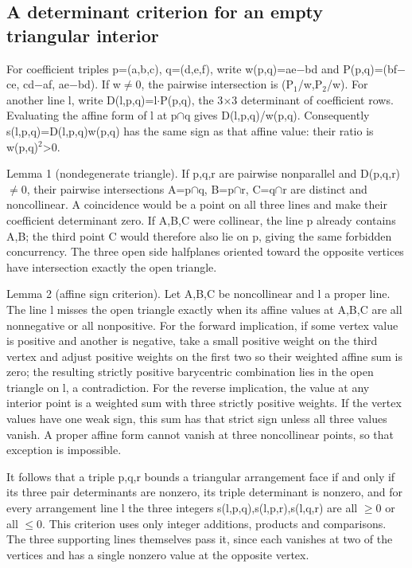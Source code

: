 \documentclass[11pt,a4paper]{article}
\begin{document}
\subsection{A determinant criterion for an empty triangular interior}
For coefficient triples p=(a,b,c), q=(d,e,f), write w(p,q)=ae\ensuremath{-}bd and P(p,q)=(bf\ensuremath{-}ce, cd\ensuremath{-}af, ae\ensuremath{-}bd). If w\ensuremath{\neq}0, the pairwise intersection is (P\ensuremath{_1}/w,P\ensuremath{_2}/w). For another line l, write D(l,p,q)=l\ensuremath{\cdot}P(p,q), the 3\ensuremath{\times}3 determinant of coefficient rows. Evaluating the affine form of l at p\ensuremath{\cap}q gives D(l,p,q)/w(p,q). Consequently s(l,p,q)=D(l,p,q)w(p,q) has the same sign as that affine value: their ratio is w(p,q)\ensuremath{^2}>0.

Lemma 1 (nondegenerate triangle). If p,q,r are pairwise nonparallel and D(p,q,r)\ensuremath{\neq}0, their pairwise intersections A=p\ensuremath{\cap}q, B=p\ensuremath{\cap}r, C=q\ensuremath{\cap}r are distinct and noncollinear. A coincidence would be a point on all three lines and make their coefficient determinant zero. If A,B,C were collinear, the line p already contains A,B; the third point C would therefore also lie on p, giving the same forbidden concurrency. The three open side halfplanes oriented toward the opposite vertices have intersection exactly the open triangle.

Lemma 2 (affine sign criterion). Let A,B,C be noncollinear and l a proper line. The line l misses the open triangle exactly when its affine values at A,B,C are all nonnegative or all nonpositive. For the forward implication, if some vertex value is positive and another is negative, take a small positive weight on the third vertex and adjust positive weights on the first two so their weighted affine sum is zero; the resulting strictly positive barycentric combination lies in the open triangle on l, a contradiction. For the reverse implication, the value at any interior point is a weighted sum with three strictly positive weights. If the vertex values have one weak sign, this sum has that strict sign unless all three values vanish. A proper affine form cannot vanish at three noncollinear points, so that exception is impossible.

It follows that a triple p,q,r bounds a triangular arrangement face if and only if its three pair determinants are nonzero, its triple determinant is nonzero, and for every arrangement line l the three integers s(l,p,q),s(l,p,r),s(l,q,r) are all \ensuremath{\geq}0 or all \ensuremath{\leq}0. This criterion uses only integer additions, products and comparisons. The three supporting lines themselves pass it, since each vanishes at two of the vertices and has a single nonzero value at the opposite vertex.
\end{document}
